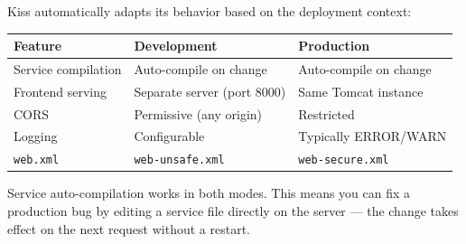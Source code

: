 Kiss automatically adapts its behavior based on the deployment context:

\begin{longtable}{P{2.7cm}P{3.9cm}P{3.3cm}}
\toprule
\textbf{Feature} & \textbf{Development} & \textbf{Production} \\
\midrule
\endhead
Service compilation & Auto-compile on change & Auto-compile on change \\
Frontend serving & Separate server (port 8000) & Same Tomcat instance \\
CORS & Permissive (any origin) & Restricted \\
Logging & Configurable & Typically ERROR/WARN \\
\texttt{web.xml} & \texttt{web-unsafe.xml} & \texttt{web-secure.xml} \\
\bottomrule
\end{longtable}

\begin{tipbox}
Service auto-compilation works in both modes.  This means you can fix a production bug by editing a service file directly on the server --- the change takes effect on the next request without a restart.
\end{tipbox}
